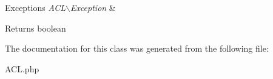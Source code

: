 \begin{DoxyExceptions}{Exceptions}
{\em ACL$\backslash$Exception} & \\
\hline
\end{DoxyExceptions}
\begin{DoxyReturn}{Returns}
boolean 
\end{DoxyReturn}


The documentation for this class was generated from the following file:\begin{DoxyCompactItemize}
\item 
ACL.php\end{DoxyCompactItemize}
